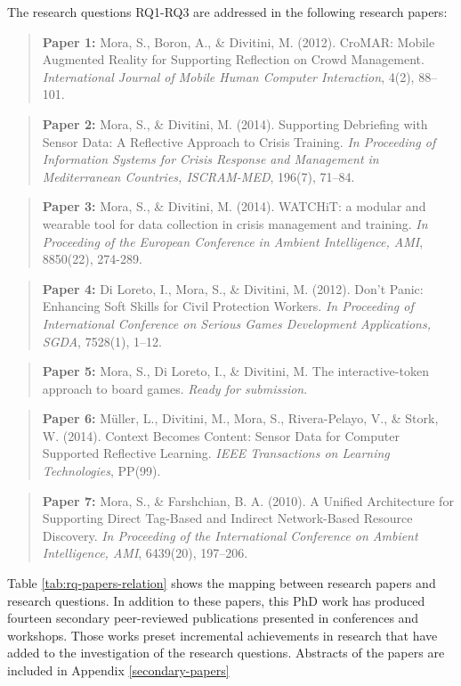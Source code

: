 The research questions RQ1-RQ3 are addressed in the following research papers:
\begin{quote}
	\textbf{Paper 1:} Mora, S., Boron, A., \& Divitini, M. (2012). CroMAR: Mobile Augmented Reality for Supporting Reflection on Crowd Management. \emph{International Journal of Mobile Human Computer Interaction}, 4(2), 88--101. 
\end{quote}
\begin{quote}
	\textbf{Paper 2:} Mora, S., \& Divitini, M. (2014). Supporting Debriefing with Sensor Data: A Reflective Approach to Crisis Training. \emph{In Proceeding of Information Systems for Crisis Response and Management in Mediterranean Countries, ISCRAM-MED}, 196(7), 71--84. 
\end{quote}
\begin{quote}
	\textbf{Paper 3:} Mora, S., \& Divitini, M. (2014). WATCHiT: a modular and wearable tool for data collection in crisis management and training. \emph{In Proceeding of the European Conference in Ambient Intelligence, AMI}, 8850(22), 274-289. 
\end{quote}
\begin{quote}
	\textbf{Paper 4:} Di Loreto, I., Mora, S., \& Divitini, M. (2012). Don't Panic: Enhancing Soft Skills for Civil Protection Workers. \emph{In Proceeding of International Conference on Serious Games Development Applications, SGDA}, 7528(1), 1--12. 
\end{quote}
\begin{quote}
	\textbf{Paper 5:} Mora, S., Di Loreto, I., \& Divitini, M. The interactive-token approach to board games. \emph{Ready for submission}. 
\end{quote}
\begin{quote}
	\textbf{Paper 6:} Müller, L., Divitini, M., Mora, S., Rivera-Pelayo, V., \& Stork, W. (2014). Context Becomes Content: Sensor Data for Computer Supported Reflective Learning. \emph{IEEE Transactions on Learning Technologies}, PP(99). 
\end{quote}
\begin{quote}
	\textbf{Paper 7:} Mora, S., \& Farshchian, B. A. (2010). A Unified Architecture for Supporting Direct Tag-Based and Indirect Network-Based Resource Discovery. \emph{In Proceeding of the International Conference on Ambient Intelligence, AMI}, 6439(20), 197--206. 
\end{quote}

Table \ref{tab:rq-papers-relation} shows the mapping between research papers and research questions. In addition to these papers, this PhD work has produced fourteen secondary peer-reviewed publications presented in conferences and workshops. Those works preset incremental achievements in research that have added to the investigation of the research questions. Abstracts of the papers are included in Appendix \ref{secondary-papers}

